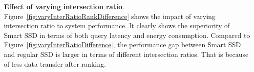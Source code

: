 



\textbf{Effect of varying intersection ratio}.
Figure~\ref{fig:varyInterRatioRankDifference} shows the impact of varying intersection ratio to system performance.
It clearly shows the superiority of Smart SSD in terms of both query latency and energy consumption. Compared to Figure~\ref{fig:varyInterRatioDifference}, the performance gap between Smart SSD and regular SSD is larger in terms of different intersection ratios. That is because of less data transfer after ranking.
